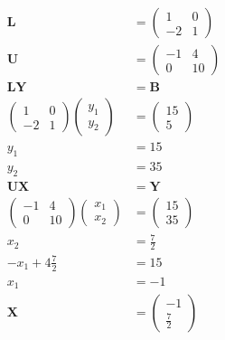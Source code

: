 \documentclass{article}
\begin{document}
\begin{align*}
  \mathbf{L}                    & = \begin{pmatrix}
                                      1  & 0 \\
                                      -2 & 1
                                    \end{pmatrix} \\
  \mathbf{U}                    & = \begin{pmatrix}
                                      -1 & 4  \\
                                      0  & 10
                                    \end{pmatrix} \\
  \mathbf{L Y}                  & = \mathbf{B}     \\
  \begin{pmatrix}
    1  & 0 \\
    -2 & 1
  \end{pmatrix} \begin{pmatrix}
                  y_1 \\
                  y_2
                \end{pmatrix} & = \begin{pmatrix}
                                    15 \\
                                    5
                                  \end{pmatrix}   \\
  y_1                           & = 15             \\
  y_2                           & = 35             \\
  \mathbf{U X}                  & = \mathbf{Y}     \\
  \begin{pmatrix}
    -1 & 4  \\
    0  & 10
  \end{pmatrix} \begin{pmatrix}
                  x_1 \\
                  x_2
                \end{pmatrix} & = \begin{pmatrix}
                                    15 \\
                                    35
                                  \end{pmatrix}   \\
  x_2                           & = \frac{7}{2}    \\
  -x_1 + 4 \frac{7}{2}          & = 15             \\
  x_1                           & = -1             \\
  \mathbf{X}                    & = \begin{pmatrix}
                                      -1 \\
                                      \frac{7}{2}
                                    \end{pmatrix}
\end{align*}
\end{document}
